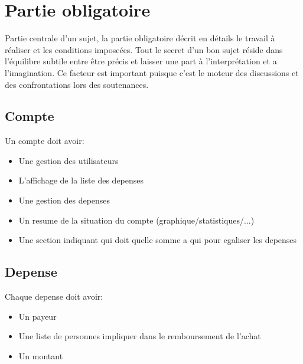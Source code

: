 \documentclass{42}
\begin{document}


\chapter{Partie obligatoire}

    Partie centrale d'un sujet, la partie obligatoire d\'ecrit en
    d\'etails le travail \`a r\'ealiser et les conditions
    impose\'ees. Tout le secret d'un bon sujet r\'eside dans
    l'\'equilibre subtile entre \^etre pr\'ecis et laisser une part
    \`a l'interpr\'etation et a l'imagination. Ce facteur est
    important puisque c'est le moteur des discussions et des
    confrontations lors des soutenances.\newline


    \section{Compte}

        Un compte doit avoir:

        \begin{itemize}\itemsep1pt
            \item Une gestion des utilisateurs
            \item L'affichage de la liste des depenses
            \item Une gestion des depenses
            \item Un resume de la situation du compte (graphique/statistiques/...)
            \item Une section indiquant qui doit quelle somme a qui pour
            egaliser les depenses
        \end{itemize}


    \section{Depense}

        Chaque depense doit avoir:

        \begin{itemize}\itemsep1pt
            \item Un payeur
            \item Une liste de personnes impliquer dans le remboursement de
            l'achat
            \item Un montant
        \end{itemize}
\end{document}

